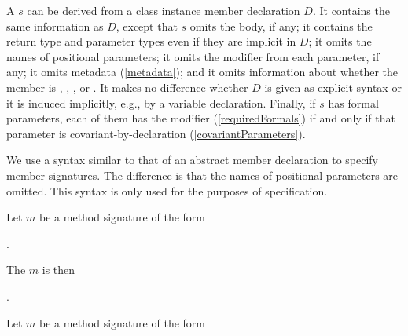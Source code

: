 \documentclass[makeidx]{article}
\begin{document}
\LMHash{}%
A  $s$
can be derived from a class instance member declaration $D$.
It contains the same information as $D$,
except that $s$ omits the body, if any;
it contains the return type and parameter types
even if they are implicit in $D$;
it omits the names of positional parameters;
it omits the modifier \FINAL{} from each parameter, if any;
it omits metadata
(\ref{metadata});
and it omits information about whether the member is
\EXTERNAL{}, \ASYNC{}, \ASYNC*, or \SYNC*.
It makes no difference whether $D$ is given as explicit syntax
or it is induced implicitly, e.g., by a variable declaration.
Finally, if $s$ has formal parameters,
each of them has the modifier \COVARIANT{}
(\ref{requiredFormals})
if and only if that parameter is covariant-by-declaration
(\ref{covariantParameters}).

\LMHash{}%
We use a syntax similar to that of an abstract member declaration
to specify member signatures.
The difference is that the names of positional parameters are omitted.
This syntax is only used for the purposes of specification.


\LMHash{}%
Let $m$ be a method signature of the form

\noindent
{}

\noindent
{}

\noindent
\code{\qquad\qquad[\PairList{\COVARIANT{}?\ T}{= d}{n+1}{n+k}])}.

\noindent
The 
$m$ is then

\noindent
{}.

\LMHash{}%
Let $m$ be a method signature of the form

\noindent
{}
\end{document}
